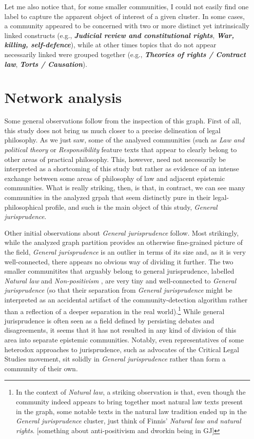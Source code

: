 \documentclass[
]{article}
\begin{document}
Let me also notice that, for some smaller communities, I could not easily find one label to capture the apparent object of interest of a given cluster. In some cases, a community appeared to be concerned with two or more distinct yet intrinsically linked constructs (e.g., \textbf{\emph{Judicial review and constitutional rights}}, \textbf{\emph{War, killing, self-defence}}), while at other times topics that do not appear necessarily linked were grouped together (e.g., \textbf{\emph{Theories of rights / Contract law}}, \textbf{\emph{Torts / Causation}}).

\hypertarget{network-analysis}{%
\section{Network analysis}\label{network-analysis}}

Some general observations follow from the inspection of this graph. First of all, this study does not bring us much closer to a precise delineation of legal philosophy. As we just saw, some of the analysed communities (such as \emph{Law and political theory} or \emph{Responsibility} feature texts that appear to clearly belong to other areas of practical philosophy. This, however, need not necessarily be interpreted as a shortcoming of this study but rather as evidence of an intense exchange between some areas of philosophy of law and adjacent epistemic communities. What is really striking, then, is that, in contract, we can see many communities in the analyzed grpah that seem distinctly pure in their legal-philosophical profile, and such is the main object of this study, \emph{General jurisprudence}.

Other initial observations about \emph{General jurisprudence} follow. Most strikingly, while the analyzed graph partition provides an otherwise fine-grained picture of the field, \emph{General jurisprudence} is an outlier in terms of its size and, as it is very well-connected, there appears no obvious way of dividing it further. The two smaller communitites that arguably belong to general jurisprudence, labelled \emph{Natural law} and \emph{Non-positivism} , are very tiny and well-connected to \emph{General jurisprudence} (so that their separation from \emph{General jurisprudence} might be interpreted as an accidental artifact of the community-detection algorithm rather than a reflection of a deeper separation in the real world).\footnote{In the context of \emph{Natural law}, a striking observation is that, even though the community indeed appears to bring together most natural law texts present in the graph, some notable texts in the natural law tradition ended up in the \emph{General jurisprudence} cluster, just think of Finnis' \emph{Natural law and natural rights}. {[}something about anti-positivism and dworkin being in GJ{]}} While general jurisprudence is often seen as a field defined by persisting debates and disagreements, it seems that it has not resulted in any kind of division of this area into separate epistemic communities. Notably, even representatives of some heterodox approaches to jurisprudence, such as advocates of the Critical Legal Studies movement, sit solidly in \emph{General jurisprudence} rather than form a community of their own.
\end{document}
